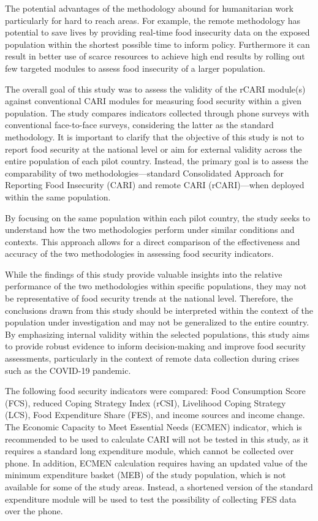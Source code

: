 \documentclass[11pt,harvard]{article}
\begin{document}
The potential advantages of the methodology abound for humanitarian work particularly for hard to reach areas. For example, the remote methodology has potential to save lives by providing real-time food insecurity data on the exposed population within the shortest possible time to inform policy. Furthermore it can result in better use of scarce resources to achieve high end results by rolling out few targeted modules to assess food insecurity of a larger population.  	

The overall goal of this study was to assess the validity of the rCARI module(s) against conventional CARI modules for measuring food security within a given population. The study compares indicators collected through phone surveys with conventional face-to-face surveys, considering the latter as the standard methodology. It is important to clarify that the objective of this study is not to report food security at the national level or aim for external validity across the entire population of each pilot country. Instead, the primary goal is to assess the comparability of two methodologies—standard Consolidated Approach for Reporting Food Insecurity (CARI) and remote CARI (rCARI)—when deployed within the same population.

By focusing on the same population within each pilot country, the study seeks to understand how the two methodologies perform under similar conditions and contexts. This approach allows for a direct comparison of the effectiveness and accuracy of the two methodologies in assessing food security indicators.

While the findings of this study provide valuable insights into the relative performance of the two methodologies within specific populations, they may not be representative of food security trends at the national level. Therefore, the conclusions drawn from this study should be interpreted within the context of the population under investigation and may not be generalized to the entire country. By emphasizing internal validity within the selected populations, this study aims to provide robust evidence to inform decision-making and improve food security assessments, particularly in the context of remote data collection during crises such as the COVID-19 pandemic.

The following food security indicators were compared: Food Consumption Score (FCS), reduced Coping Strategy Index (rCSI), Livelihood Coping Strategy (LCS), Food Expenditure Share (FES), and income sources and income change. The Economic Capacity to Meet Essential Needs (ECMEN) indicator, which is recommended to be used to calculate CARI will not be tested in this study, as it requires a standard long expenditure module, which cannot be collected over phone. In addition, ECMEN calculation requires having an updated value of the minimum expenditure basket (MEB) of the study population, which is not available for some of the study areas. Instead, a shortened version of the standard expenditure module will be used to test the possibility of collecting FES data over the phone.
\end{document}
